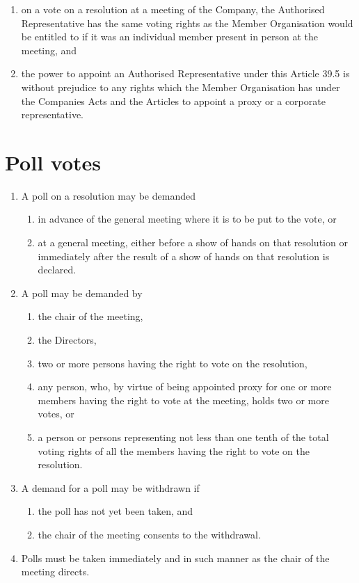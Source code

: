 \documentclass[a4paper,12pt]{article}
\begin{document}
\begin{enumerate}
\begin{enumerate}
    \item on a vote on a resolution at a meeting of the Company, the Authorised Representative has the same voting rights as the Member Organisation would be entitled to if it was an individual member present in person at the meeting, and
    \item the power to appoint an Authorised Representative under this Article 39.5 is without prejudice to any rights which the Member Organisation has under the Companies Acts and the Articles to appoint a proxy or a corporate representative.
  \end{enumerate}
\end{enumerate}

\section{Poll votes}

\begin{enumerate}
  \item A poll on a resolution may be demanded
  \begin{enumerate}
    \item in advance of the general meeting where it is to be put to the vote, or
    \item at a general meeting, either before a show of hands on that resolution or immediately after the result of a show of hands on that resolution is declared.
  \end{enumerate}
  \item A poll may be demanded by
  \begin{enumerate}
    \item the chair of the meeting,
    \item the Directors,
    \item two or more persons having the right to vote on the resolution,
    \item any person, who, by virtue of being appointed proxy for one or more members having the right to vote at the meeting, holds two or more votes, or
    \item a person or persons representing not less than one tenth of the total voting rights of all the members having the right to vote on the resolution.
  \end{enumerate}
  \item A demand for a poll may be withdrawn if
  \begin{enumerate}
    \item the poll has not yet been taken, and
    \item the chair of the meeting consents to the withdrawal.
  \end{enumerate}
  \item Polls must be taken immediately and in such manner as the chair of the meeting directs.
\end{enumerate}
\end{document}
